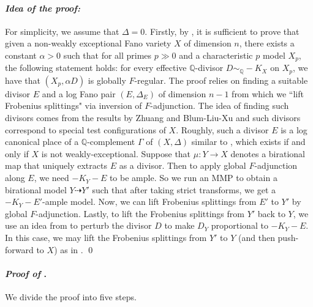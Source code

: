\documentclass[11pt,reqno]{amsart}
\newcommand{\Q}{\mathbb{Q}}
\numberwithin{equation}{section}
\theoremstyle{definition}
\begin{document}
\paragraph{\emph{Idea of the proof:}}
For simplicity, we assume that $\Delta =0$. Firstly, by , it is sufficient to prove that given a non-weakly exceptional Fano variety $X$ of dimension $n$, there exists a constant $\alpha > 0$ such that for all primes $p \gg 0$ and a characteristic $p$ model $X_p$, the following statement holds: for every effective $\Q$-divisor $D \sim_\Q -K_X $ on $X_p$, we have that $(X_p, \alpha D)$ is globally $F$-regular. The proof relies on finding a suitable divisor $E$ and a log Fano pair $(E, \Delta_E)$ of dimension $n-1$ from which we ``lift Frobenius splittings" via inversion of $F$-adjunction. The idea of finding such divisors comes from the results by Zhuang and Blum-Liu-Xu \cite{BLX22} and such divisors correspond to special test configurations of $X$. Roughly, such a divisor $E$ is a log canonical place of a $\Q$-complement $\Gamma$ of $(X, \Delta)$ similar to , which exists if and only if $X$ is not weakly-exceptional. Suppose that $\mu: Y \to X$ denotes a birational map that uniquely extracts $E$ as a divisor. Then to apply global $F$-adjunction along $E$, we need $-K_Y - E$ to be ample. So we run an MMP to obtain a birational model $Y \dashrightarrow Y'$ such that after taking strict transforms, we get a $-K_{Y}- E'$-ample model. Now, we can lift Frobenius splittings from $E'$ to $Y'$ by global $F$-adjunction. Lastly, to lift the Frobenius splittings from $Y' $ back to $Y$, we use an idea from \cite{LiuXuZhuangHigherrankfinitegeneration} to perturb the divisor $D$ to make $D_Y$ proportional to $-K_Y - E$. In this case, we may lift the Frobenius splittings from $Y'$ to $Y$ (and then push-forward to $X$) as in . \qed

\bigskip

\paragraph{\textit{Proof of }.} We divide the proof into five steps.
\medskip
\end{document}

